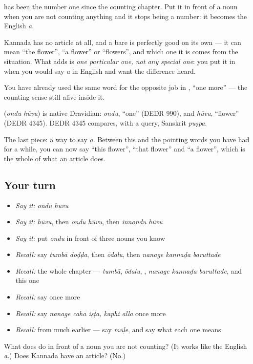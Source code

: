  has been the number one since the counting chapter. Put it in front of a noun when you are not counting anything and it stops being a number: it becomes the English \emph{a}.

Kannada has no article at all, and a bare  is perfectly good on its own — it can mean \textquotedblleft{}the flower\textquotedblright{}, \textquotedblleft{}a flower\textquotedblright{} or \textquotedblleft{}flowers\textquotedblright{}, and which one it is comes from the situation. What  adds is \emph{one particular one, not any special one}: you put it in when you would say \emph{a} in English and want the difference heard.

You have already used the same word for the opposite job in , \textquotedblleft{}one more\textquotedblright{} — the counting sense still alive inside it.

\begin{cousinweb}
\textbf{ } (\emph{ondu hūvu}) is native Dravidian: \emph{ondu}, \textquotedblleft{}one\textquotedblright{} (DEDR 990), and \emph{hūvu}, \textquotedblleft{}flower\textquotedblright{} (DEDR 4345). DEDR 4345 compares, with a query, Sanskrit \emph{puṣpa}.
\end{cousinweb}

\begin{grammarlens}[title={What you've built}]
The last piece: a way to say \emph{a}. Between this and the pointing words you have had for a while, you can now say \textquotedblleft{}this flower\textquotedblright{}, \textquotedblleft{}that flower\textquotedblright{} and \textquotedblleft{}a flower\textquotedblright{}, which is the whole of what an article does.
\end{grammarlens}

\subsection*{Your turn}
\begin{itemize}
\raggedright
  \item \emph{Say it:} \emph{ondu hūvu}
  \item \emph{Say it:} \emph{hūvu}, then \emph{ondu hūvu}, then \emph{innondu hūvu}
  \item \emph{Say it:} put \emph{ondu} in front of three nouns you know
  \item \emph{Recall:} say \emph{tumbā doḍḍa}, then \emph{ōdalu}, then \emph{nanage kannaḍa baruttade}
  \item \emph{Recall:} the whole chapter — \emph{tumbā}, \emph{ōdalu}, \emph{}, \emph{nanage kannaḍa baruttade}, and this one
  \item \emph{Recall:} say \emph{} once more
  \item \emph{Recall:} say \emph{nanage cahā iṣṭa, kāphi alla} once more
  \item \emph{Recall:} from much earlier — say \emph{mūḷe}, and say what each one means
\end{itemize}

\begin{tcolorbox}[breakable,colback=teal!4,colframe=teal!35!black,title={Before you move on}]
What does  do in front of a noun you are not counting? (It works like the English \emph{a}.) Does Kannada have an article? (No.)
\end{tcolorbox}

